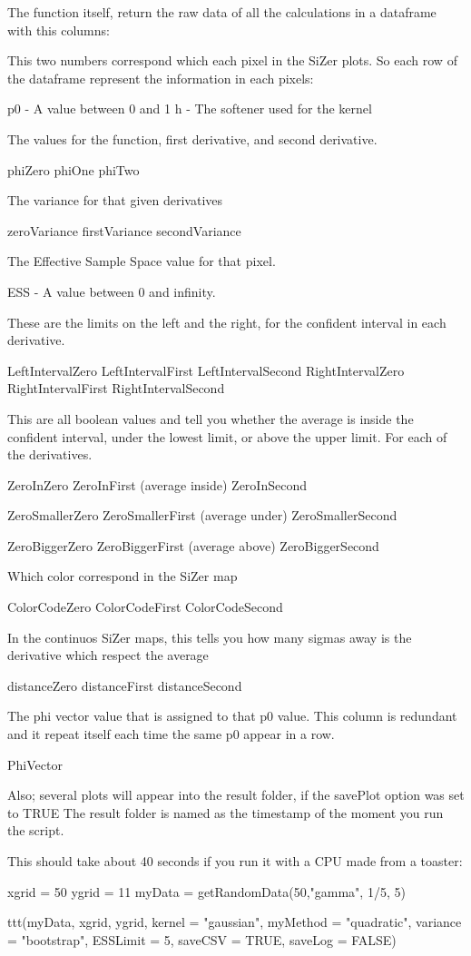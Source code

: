 \documentclass[letterpaper]{book}
\begin{document}
\begin{Value}
The function itself, return the raw data of all the calculations in a dataframe with this columns:

This two numbers correspond which each pixel in the SiZer plots. So each row of the dataframe represent the information in each pixels:

p0 - A value between 0 and 1
h  - The softener used for the kernel

The values for the function, first derivative, and second derivative.

phiZero
phiOne
phiTwo

The variance for that given derivatives

zeroVariance
firstVariance
secondVariance

The Effective Sample Space value for that pixel.

ESS - A value between 0 and infinity.

These are the limits on the left and the right, for the confident interval in each derivative.

LeftIntervalZero
LeftIntervalFirst
LeftIntervalSecond
RightIntervalZero
RightIntervalFirst
RightIntervalSecond

This are all boolean values and tell you whether the average is
inside the confident interval, under the lowest limit, or above
the upper limit. For each of the derivatives.

ZeroInZero
ZeroInFirst        (average inside)
ZeroInSecond

ZeroSmallerZero
ZeroSmallerFirst   (average under)
ZeroSmallerSecond

ZeroBiggerZero
ZeroBiggerFirst    (average above)
ZeroBiggerSecond

Which color correspond in the SiZer map

ColorCodeZero
ColorCodeFirst
ColorCodeSecond

In the continuos SiZer maps, this tells you how many sigmas away is
the derivative which respect the average

distanceZero
distanceFirst
distanceSecond

The phi vector value that is assigned to that p0 value. This column
is redundant and it repeat itself each time the same p0 appear in a
row.

PhiVector

Also; several plots will appear into the result folder, if the
savePlot option was set to TRUE The result folder is named as the
timestamp of the moment you run the script.
\end{Value}
%
\begin{Examples}
\begin{ExampleCode}

This should take about 40 seconds if you run it with a CPU made from a toaster:

xgrid = 50
ygrid = 11
myData  = getRandomData(50,"gamma", 1/5, 5)

ttt(myData, xgrid, ygrid, kernel = "gaussian", myMethod = "quadratic", variance = "bootstrap",  ESSLimit = 5, saveCSV = TRUE, saveLog = FALSE)

\end{ExampleCode}
\end{Examples}
\printindex{}
\end{document}
